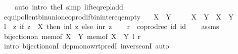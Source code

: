\begin{isabellebody}
\ \ \ \ {\isacharparenleft}{\kern0pt}auto\ intro{\isacharcolon}{\kern0pt}\ the{}I{}\ simp{\isacharcolon}{\kern0pt}\ lift{\isacharunderscore}{\kern0pt}eq{\isacharunderscore}{\kern0pt}repl{\isacharunderscore}{\kern0pt}add{\isacharparenright}{\kern0pt}\isanewline
{}\isamarkupfalse%
%
\endisatagproof
{\isafoldproof}%
%
\isadelimproof
\isanewline
%
\endisadelimproof
\isanewline
{}\isamarkupfalse%
\ equipollent{\isacharunderscore}{\kern0pt}bin{\isacharunderscore}{\kern0pt}union{\isacharunderscore}{\kern0pt}coprod{\isacharunderscore}{\kern0pt}if{\isacharunderscore}{\kern0pt}bin{\isacharunderscore}{\kern0pt}inter{\isacharunderscore}{\kern0pt}eq{\isacharunderscore}{\kern0pt}empty{\isacharcolon}{\kern0pt}\isanewline
\ \ \ {\isachardoublequoteopen}X\ {\isasyminter}\ Y\ {\isacharequal}{\kern0pt}\ {\isacharbraceleft}{\kern0pt}{\isacharbraceright}{\kern0pt}{\isachardoublequoteclose}\isanewline
\ \ \ {\isachardoublequoteopen}X\ {\isasymunion}\ Y\ {\isasymapprox}\ X\ {\isasymCoprod}\ Y{\isachardoublequoteclose}\isanewline
%
\isadelimproof
%
\endisadelimproof
%
\isatagproof
{}\isamarkupfalse%
\ {\isacharminus}{\kern0pt}\isanewline
\ \ \isamarkupfalse%
\ {\isacharquery}{\kern0pt}l\ {\isacharequal}{\kern0pt}\ {\isachardoublequoteopen}{\isasymlambda}z{\isachardot}{\kern0pt}\ if\ z\ {\isasymin}\ X\ then\ inl\ z\ else\ inr\ z{\isachardoublequoteclose}\isanewline
\ \ \isamarkupfalse%
\ {\isacharquery}{\kern0pt}r\ {\isacharequal}{\kern0pt}\ {\isachardoublequoteopen}coprod{\isacharunderscore}{\kern0pt}rec\ id\ id{\isachardoublequoteclose}\isanewline
\ \ \isamarkupfalse%
\ assms\ \isamarkupfalse%
\ {\isachardoublequoteopen}bijection{\isacharunderscore}{\kern0pt}on\ {\isacharparenleft}{\kern0pt}mem{\isacharunderscore}{\kern0pt}of\ {\isacharparenleft}{\kern0pt}X\ {\isasymunion}\ Y{\isacharparenright}{\kern0pt}{\isacharparenright}{\kern0pt}\ {\isacharparenleft}{\kern0pt}mem{\isacharunderscore}{\kern0pt}of\ {\isacharparenleft}{\kern0pt}X\ {\isasymCoprod}\ Y{\isacharparenright}{\kern0pt}{\isacharparenright}{\kern0pt}\ {\isacharquery}{\kern0pt}l\ {\isacharquery}{\kern0pt}r{\isachardoublequoteclose}\isanewline
\ \ \ \ \isamarkupfalse%
\ {\isacharparenleft}{\kern0pt}intro\ bijection{\isacharunderscore}{\kern0pt}onI\ dep{\isacharunderscore}{\kern0pt}mono{\isacharunderscore}{\kern0pt}wrt{\isacharunderscore}{\kern0pt}predI\ inverse{\isacharunderscore}{\kern0pt}onI{\isacharparenright}{\kern0pt}\ auto\isanewline

\end{isabellebody}
